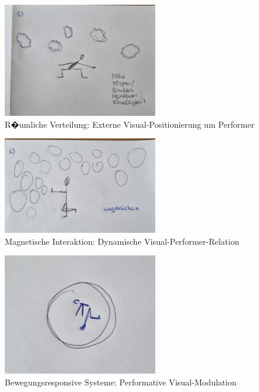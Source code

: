 \begin{figure}[!htbp]
    \centering
    \includegraphics[width=0.6\textwidth,height=0.25\textheight,keepaspectratio]{images/Sprint3_2.jpg}
    \caption{R�umliche Verteilung: Externe Visual-Positionierung um Performer}
    \label{fig:external_positioning}
\end{figure}

\begin{figure}[!htbp]
    \centering
    \includegraphics[width=0.6\textwidth,height=0.25\textheight,keepaspectratio]{images/Sprint3_3.jpg}
    \caption{Magnetische Interaktion: Dynamische Visual-Performer-Relation}
    \label{fig:magnetic_interaction}
\end{figure}

\begin{figure}[!htbp]
    \centering
    \includegraphics[width=0.6\textwidth,height=0.25\textheight,keepaspectratio]{images/Sprint3_4.jpg}
    \caption{Bewegungsresponsive Systeme: Performative Visual-Modulation}
    \label{fig:movement_responsive}
\end{figure}

